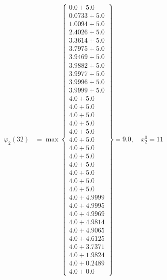\documentclass{article}
\begin{document}
\begin{align*}
\varphi_{2}(32) &= \max \left\{ \begin{array}{c}
0.0 + 5.0 \\
 0.0733 + 5.0 \\
 1.0094 + 5.0 \\
 2.4026 + 5.0 \\
 3.3614 + 5.0 \\
 3.7975 + 5.0 \\
 3.9469 + 5.0 \\
 3.9882 + 5.0 \\
 3.9977 + 5.0 \\
 3.9996 + 5.0 \\
 3.9999 + 5.0 \\
 4.0 + 5.0 \\
 4.0 + 5.0 \\
 4.0 + 5.0 \\
 4.0 + 5.0 \\
 4.0 + 5.0 \\
 4.0 + 5.0 \\
 4.0 + 5.0 \\
 4.0 + 5.0 \\
 4.0 + 5.0 \\
 4.0 + 5.0 \\
 4.0 + 5.0 \\
 4.0 + 5.0 \\
 4.0 + 4.9999 \\
 4.0 + 4.9995 \\
 4.0 + 4.9969 \\
 4.0 + 4.9814 \\
 4.0 + 4.9065 \\
 4.0 + 4.6125 \\
 4.0 + 3.7371 \\
 4.0 + 1.9824 \\
 4.0 + 0.2489 \\
 4.0 + 0.0
\end{array} \right\}=9.0, \quad x_{2}^0=11\\
  

\end{align*}
\end{document}
